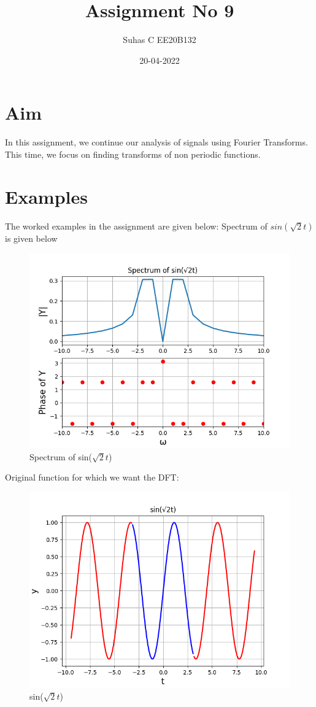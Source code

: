 \documentclass[11pt, a4paper]{article}
\title{Assignment No 9} %
\author{Suhas C EE20B132} %
\date{20-04-2022} %
\begin{document}
		
		
\maketitle %
\section{Aim}
In this assignment, we continue our analysis of signals using Fourier Transforms. This time, we focus on finding transforms of non periodic functions. 
\section{Examples}
The worked examples in the assignment are given below:
Spectrum of $sin(\sqrt{2}t)$ is given below\newline
\begin{figure}[h!]
\centering
\includegraphics[scale=0.6]{fig10-1.png}
\caption{Spectrum of sin($\sqrt{2}t$)}
\label{fig:universe}
\end{figure}
\clearpage
Original function for which we want the DFT:
\begin{figure}[h!]
\centering
\includegraphics[scale=0.6]{fig10-2.png}
\caption{sin($\sqrt{2}t$)}
\label{fig:universe}
\end{figure}
\end{document}
